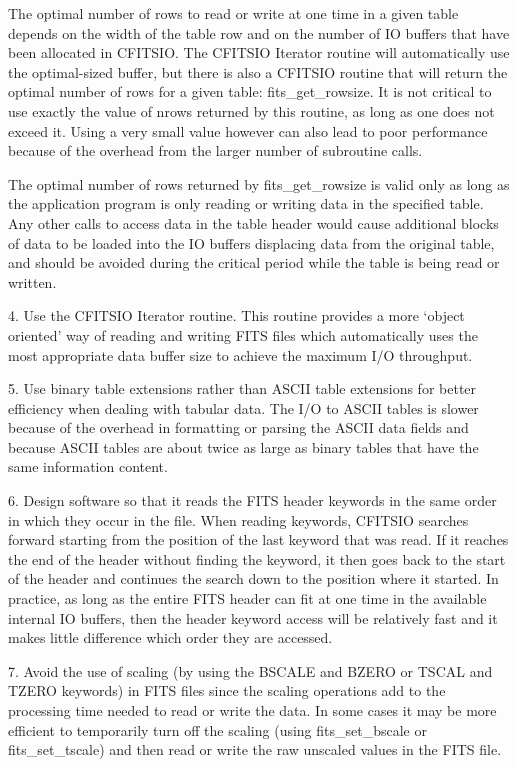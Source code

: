 \documentclass[11pt]{book}
\begin{document}
The optimal number of rows to read or write at one time in a given
table depends on the width of the table row and on the number of IO
buffers that have been allocated in CFITSIO.  The CFITSIO Iterator routine
will automatically use the optimal-sized buffer, but there is also a
CFITSIO routine that will return the optimal number of rows for a given
table:  fits\_get\_rowsize.  It is not critical to use exactly the
value of nrows returned by this routine, as long as one does not exceed
it.  Using a very small value however can also lead to poor performance
because of the overhead from the larger number of subroutine calls.

The optimal number of rows returned by fits\_get\_rowsize is valid only
as long as the application program is only reading or writing data in
the specified table.  Any other calls to access data in the table
header would  cause additional blocks of data
to be loaded into the IO buffers displacing data from the original
table, and should be avoided during the critical period while the table
is being read or written.

4.  Use the CFITSIO Iterator routine.  This routine provides a
more `object oriented' way of reading and writing FITS files
which automatically uses the most appropriate data buffer size
to achieve the maximum I/O throughput.

5.  Use binary table extensions rather than ASCII table
extensions for better efficiency  when dealing with tabular data.  The
I/O to ASCII tables is slower because of the overhead in formatting or
parsing the ASCII data fields and because ASCII tables are about twice
as large as binary tables that have the same information content.

6. Design software so that it reads the FITS header keywords in the
same order in which they occur in the file.  When reading keywords,
CFITSIO searches forward starting from the position of the last keyword
that was read.  If it reaches the end of the header without finding the
keyword, it then goes back to the start of the header and continues the
search down to the position where it started.  In practice, as long as
the entire FITS header can fit at one time in the available internal IO
buffers, then the header keyword access will be relatively fast and it makes
little difference which order they are accessed.

7. Avoid the use of scaling (by using the BSCALE and BZERO or TSCAL and
TZERO keywords) in FITS files since the scaling operations add to the
processing time needed to read or write the data.  In some cases it may
be more efficient to temporarily turn off the scaling (using fits\_set\_bscale or
fits\_set\_tscale) and then read or write the raw unscaled values in the FITS
file.
\end{document}
